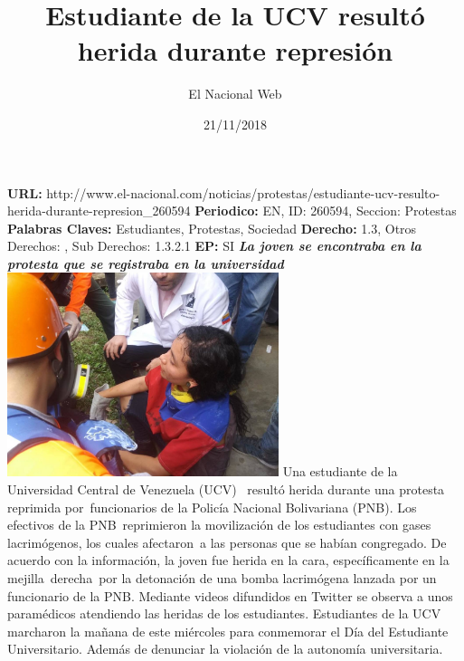 \documentclass{article}%
\title{\textbf{Estudiante de la UCV resultó herida durante represión}}%
\author{El Nacional Web}%
\date{21/11/2018}%
\begin{document}
%
\normalsize%
\maketitle%
\textbf{URL: }%
http://www.el{-}nacional.com/noticias/protestas/estudiante{-}ucv{-}resulto{-}herida{-}durante{-}represion\_260594\newline%
%
\textbf{Periodico: }%
EN, %
ID: %
260594, %
Seccion: %
Protestas\newline%
%
\textbf{Palabras Claves: }%
Estudiantes, Protestas, Sociedad\newline%
%
\textbf{Derecho: }%
1.3, %
Otros Derechos: %
, %
Sub Derechos: %
1.3.2.1\newline%
%
\textbf{EP: }%
SI\newline%
\newline%
%
\textbf{\textit{La joven se encontraba en la protesta que se registraba en la universidad}}%
\newline%
\newline%
%
\includegraphics[width=300px]{70.jpg}%
\newline%
%
Una estudiante de la Universidad Central de Venezuela (UCV)~ resultó herida durante una protesta reprimida por~funcionarios de la Policía Nacional Bolivariana (PNB).%
\newline%
%
Los efectivos de la PNB~reprimieron la movilización de los estudiantes con gases lacrimógenos, los cuales afectaron~a las personas que se habían congregado.%
\newline%
%
De acuerdo con la información, la joven fue herida en la cara, específicamente en la mejilla~derecha~por la detonación de una bomba lacrimógena lanzada por un funcionario de la PNB.%
\newline%
%
Mediante videos difundidos en Twitter se observa a unos paramédicos atendiendo las heridas de los estudiantes.%
\newline%
%
Estudiantes de la UCV marcharon la mañana de este miércoles para conmemorar el Día del Estudiante Universitario. Además de denunciar la violación de la autonomía universitaria.%
\newline%
%
\end{document}
